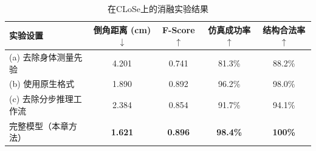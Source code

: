 \begin{table}[h]
    \centering\small
    \caption{在CLoSe上的消融实验结果}
    \label{tab:ch4-ablation}
    \renewcommand{\arraystretch}{1.2}
    \setlength{\tabcolsep}{7pt}
    \begin{tabular}{l *{4}{c}}
        \toprule
        \textbf{实验设置}
        & \textbf{倒角距离 (cm)}$\downarrow$ & \textbf{F-Score}$\uparrow$ & \textbf{仿真成功率}$\uparrow$ & \textbf{结构合法率}$\uparrow$ \\
        \midrule
        (a) 去除身体测量先验
        & 4.201 & 0.741 & 81.3\% & 88.2\% \\
        (b) 使用原生格式
        & 1.890 & 0.892 & 96.2\% & 98.0\% \\
        (c) 去除分步推理工作流
        & 2.384 & 0.854 & 91.7\% & 94.1\% \\
        \midrule
        完整模型（本章方法）
        & \textbf{1.621} & \textbf{0.896} & \textbf{98.4\%} & \textbf{100\%} \\
        \bottomrule
    \end{tabular}
\end{table}
